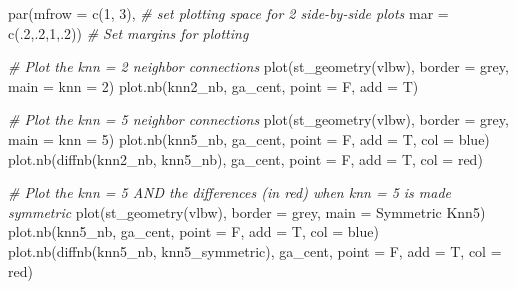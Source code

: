 \documentclass[
]{book}
\newenvironment{Shaded}{\begin{snugshade}}{\end{snugshade}}
\newcommand{\AttributeTok}[1]{\textcolor[rgb]{0.77,0.63,0.00}{#1}}
\newcommand{\CommentTok}[1]{\textcolor[rgb]{0.56,0.35,0.01}{\textit{#1}}}
\newcommand{\DecValTok}[1]{\textcolor[rgb]{0.00,0.00,0.81}{#1}}
\newcommand{\FunctionTok}[1]{\textcolor[rgb]{0.00,0.00,0.00}{#1}}
\newcommand{\NormalTok}[1]{#1}
\newcommand{\StringTok}[1]{\textcolor[rgb]{0.31,0.60,0.02}{#1}}
\begin{document}
\begin{Shaded}
\begin{Highlighting}[]
\FunctionTok{par}\NormalTok{(}\AttributeTok{mfrow =} \FunctionTok{c}\NormalTok{(}\DecValTok{1}\NormalTok{, }\DecValTok{3}\NormalTok{),        }\CommentTok{\# set plotting space for 2 side{-}by{-}side plots}
    \AttributeTok{mar =} \FunctionTok{c}\NormalTok{(.}\DecValTok{2}\NormalTok{,.}\DecValTok{2}\NormalTok{,}\DecValTok{1}\NormalTok{,.}\DecValTok{2}\NormalTok{))    }\CommentTok{\# Set margins for plotting}

\CommentTok{\# Plot the knn = 2 neighbor connections}
\FunctionTok{plot}\NormalTok{(}\FunctionTok{st\_geometry}\NormalTok{(vlbw), }\AttributeTok{border =} \StringTok{\textquotesingle{}grey\textquotesingle{}}\NormalTok{, }\AttributeTok{main =} \StringTok{\textquotesingle{}knn = 2\textquotesingle{}}\NormalTok{)}
\FunctionTok{plot.nb}\NormalTok{(knn2\_nb, ga\_cent, }\AttributeTok{point =}\NormalTok{ F, }\AttributeTok{add =}\NormalTok{ T)}

\CommentTok{\# Plot the knn = 5 neighbor connections}
\FunctionTok{plot}\NormalTok{(}\FunctionTok{st\_geometry}\NormalTok{(vlbw), }\AttributeTok{border =} \StringTok{\textquotesingle{}grey\textquotesingle{}}\NormalTok{, }\AttributeTok{main =} \StringTok{\textquotesingle{}knn = 5\textquotesingle{}}\NormalTok{)}
\FunctionTok{plot.nb}\NormalTok{(knn5\_nb, ga\_cent, }\AttributeTok{point =}\NormalTok{ F, }\AttributeTok{add =}\NormalTok{ T, }\AttributeTok{col =} \StringTok{\textquotesingle{}blue\textquotesingle{}}\NormalTok{)}
\FunctionTok{plot.nb}\NormalTok{(}\FunctionTok{diffnb}\NormalTok{(knn2\_nb, knn5\_nb), ga\_cent, }\AttributeTok{point =}\NormalTok{ F, }\AttributeTok{add =}\NormalTok{ T, }\AttributeTok{col =} \StringTok{\textquotesingle{}red\textquotesingle{}}\NormalTok{)}

\CommentTok{\# Plot the knn = 5 AND the differences (in red) when knn = 5 is made symmetric}
\FunctionTok{plot}\NormalTok{(}\FunctionTok{st\_geometry}\NormalTok{(vlbw), }\AttributeTok{border =} \StringTok{\textquotesingle{}grey\textquotesingle{}}\NormalTok{, }\AttributeTok{main =} \StringTok{\textquotesingle{}Symmetric Knn5\textquotesingle{}}\NormalTok{)}
\FunctionTok{plot.nb}\NormalTok{(knn5\_nb, ga\_cent, }\AttributeTok{point =}\NormalTok{ F, }\AttributeTok{add =}\NormalTok{ T, }\AttributeTok{col =} \StringTok{\textquotesingle{}blue\textquotesingle{}}\NormalTok{)}
\FunctionTok{plot.nb}\NormalTok{(}\FunctionTok{diffnb}\NormalTok{(knn5\_nb, knn5\_symmetric), ga\_cent, }\AttributeTok{point =}\NormalTok{ F, }\AttributeTok{add =}\NormalTok{ T, }\AttributeTok{col =} \StringTok{\textquotesingle{}red\textquotesingle{}}\NormalTok{)}
\end{Highlighting}
\end{Shaded}
\end{document}
